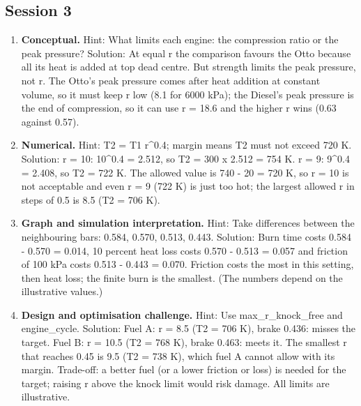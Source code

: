 \documentclass[11pt,a4paper]{article}
\begin{document}
\subsection*{Session 3}
\begin{enumerate}[nosep]
\item \textbf{Conceptual.} Hint: What limits each engine: the compression ratio or the peak pressure? Solution: At equal r the comparison favours the Otto because all its heat is added at top dead centre. But strength limits the peak pressure, not r. The Otto's peak pressure comes after heat addition at constant volume, so it must keep r low (8.1 for 6000 kPa); the Diesel's peak pressure is the end of compression, so it can use r = 18.6 and the higher r wins (0.63 against 0.57).
\item \textbf{Numerical.} Hint: T2 = T1 r\textasciicircum{}0.4; margin means T2 must not exceed 720 K. Solution: r = 10: 10\textasciicircum{}0.4 = 2.512, so T2 = 300 x 2.512 = 754 K. r = 9: 9\textasciicircum{}0.4 = 2.408, so T2 = 722 K. The allowed value is 740 - 20 = 720 K, so r = 10 is not acceptable and even r = 9 (722 K) is just too hot; the largest allowed r in steps of 0.5 is 8.5 (T2 = 706 K).
\item \textbf{Graph and simulation interpretation.} Hint: Take differences between the neighbouring bars: 0.584, 0.570, 0.513, 0.443. Solution: Burn time costs 0.584 - 0.570 = 0.014, 10 percent heat loss costs 0.570 - 0.513 = 0.057 and friction of 100 kPa costs 0.513 - 0.443 = 0.070. Friction costs the most in this setting, then heat loss; the finite burn is the smallest. (The numbers depend on the illustrative values.)
\item \textbf{Design and optimisation challenge.} Hint: Use max\_r\_knock\_free and engine\_cycle. Solution: Fuel A: r = 8.5 (T2 = 706 K), brake 0.436: misses the target. Fuel B: r = 10.5 (T2 = 768 K), brake 0.463: meets it. The smallest r that reaches 0.45 is 9.5 (T2 = 738 K), which fuel A cannot allow with its margin. Trade-off: a better fuel (or a lower friction or loss) is needed for the target; raising r above the knock limit would risk damage. All limits are illustrative.
\end{enumerate}
\end{document}
